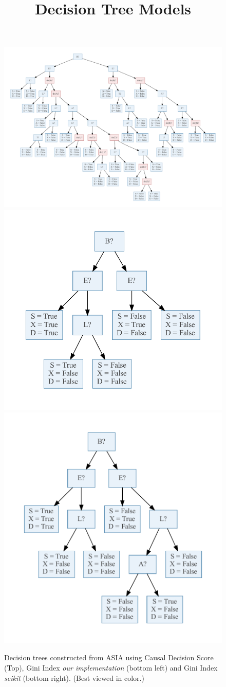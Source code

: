 \documentclass{article}
\title{Decision Tree Models}
\author{}
\date{} %
\begin{document}
\maketitle


\begin{figure}[h]
\centering
\includegraphics[width=0.73\linewidth]{./dts/asia_cl_606.pdf} %
\includegraphics[width=0.39\linewidth]{./dts/asia_gini_corr_606.pdf} %
\includegraphics[width=0.39\linewidth]{./dts/asia_gini_scikit_corr_606.pdf}

\caption{Decision trees constructed from ASIA using Causal Decision Score (Top), Gini Index \textit{our implementation} (bottom left) and Gini Index \textit{scikit} (bottom right). (Best viewed in color.)}
\end{figure}
\end{document}
